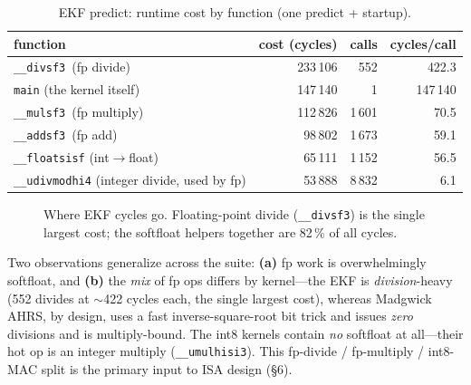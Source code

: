 \documentclass[11pt]{article}
\newcommand{\code}[1]{\texttt{#1}}
\newcommand{\ms}{\texttt{\_\_mulsf3}}
\newcommand{\as}{\texttt{\_\_addsf3}}
\newcommand{\ds}{\texttt{\_\_divsf3}}
\begin{document}
\begin{table}[ht]\centering\small
\caption{EKF predict: runtime cost by function (one predict + startup).}\label{tab:cost}
\begin{tabular}{@{}lrrr@{}}
\toprule
function & cost (cycles) & calls & cycles/call \\
\midrule
\ds\ (fp divide) & 233\,106 & 552 & 422.3 \\
\code{main} (the kernel itself) & 147\,140 & 1 & 147\,140 \\
\ms\ (fp multiply) & 112\,826 & 1\,601 & 70.5 \\
\as\ (fp add) & 98\,802 & 1\,673 & 59.1 \\
\code{\_\_floatsisf} (int$\rightarrow$float) & 65\,111 & 1\,152 & 56.5 \\
\code{\_\_udivmodhi4} (integer divide, used by fp) & 53\,888 & 8\,832 & 6.1 \\
\bottomrule
\end{tabular}
\end{table}

\begin{figure}[ht]\centering
{}
\caption{Where EKF cycles go. Floating-point divide (\ds) is the single largest cost; the softfloat
helpers together are 82\,\% of all cycles.}\label{fig:ekfcost}
\end{figure}

\noindent Two observations generalize across the suite: \textbf{(a)} fp work is overwhelmingly softfloat,
and \textbf{(b)} the \emph{mix} of fp ops differs by kernel---the EKF is \emph{division}-heavy (552
divides at $\sim$422 cycles each, the single largest cost), whereas Madgwick AHRS, by design, uses a fast
inverse-square-root bit trick and issues \emph{zero} divisions and is multiply-bound. The int8 kernels
contain \emph{no} softfloat at all---their hot op is an integer multiply (\code{\_\_umulhisi3}). This
fp-divide / fp-multiply / int8-MAC split is the primary input to ISA design (\S6).
\end{document}
